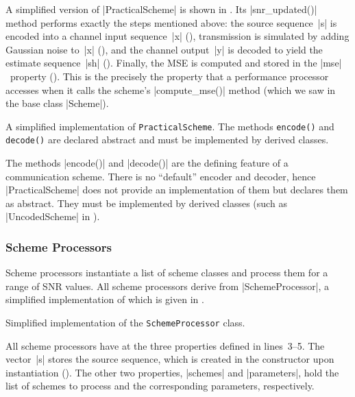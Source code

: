 A simplified version of |PracticalScheme| is shown in .
Its |snr_updated()| method performs exactly the steps mentioned above: the
source sequence~|s| is encoded into a channel input sequence~|x| (),
transmission is simulated by adding Gaussian noise to~|x| (), and
the channel output~|y| is decoded to yield the estimate sequence~|sh|
().  Finally, the MSE is computed and stored in the |mse|~property
().  This is the precisely the property that a performance processor
accesses when it calls the scheme's |compute_mse()| method (which we saw in the
base class |Scheme|). 

\begin{listing}
  \caption{A simplified implementation of \texttt{PracticalScheme}. The methods
  \texttt{encode()} and \texttt{decode()} are declared abstract and must be
  implemented by derived classes.}
  \label{lst:practicalscheme}
\end{listing}

The methods |encode()| and |decode()| are the defining feature of a
communication scheme. There is no ``default'' encoder and decoder, hence
|PracticalScheme| does not provide an implementation of them but declares them
as abstract. They must be implemented by derived classes (such as
|UncodedScheme| in ).


\subsubsection{Scheme Processors}

Scheme processors instantiate a list of scheme classes and process them for a
range of SNR values. All scheme processors derive from |SchemeProcessor|, a
simplified implementation of which is given in . 

\begin{listing}
  \caption{Simplified implementation of the \texttt{SchemeProcessor} class.}
  \label{lst:schemeprocessor}
\end{listing}

All scheme processors have at the three properties defined in lines~3--5. The
vector~|s| stores the source sequence, which is created in the constructor upon
instantiation (). The other two properties, |schemes| and
|parameters|, hold the list of schemes to process and the corresponding
parameters, respectively. 

